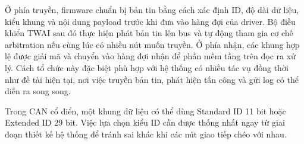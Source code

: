 Ở phía truyền, firmware chuẩn bị bản tin bằng cách xác định ID, độ dài dữ liệu, kiểu khung
và nội dung payload trước khi đưa vào hàng đợi của driver. Bộ điều khiển TWAI sau đó
thực hiện phát bản tin lên bus và tự động tham gia cơ chế arbitration nếu cùng lúc có nhiều
nút muốn truyền. Ở phía nhận, các khung hợp lệ được giải mã và chuyển vào hàng đợi nhận
để phần mềm tầng trên đọc ra xử lý. Cách tổ chức này đặc biệt phù hợp với hệ thống có
nhiều tác vụ đồng thời như đề tài hiện tại, nơi việc truyền bản tin, phát hiện tấn công và gửi
log có thể diễn ra song song.

Trong CAN cổ điển, một khung dữ liệu có thể dùng Standard ID 11 bit hoặc Extended ID
29 bit. Việc lựa chọn kiểu ID cần được thống nhất ngay từ giai đoạn thiết kế hệ thống để
tránh sai khác khi các nút giao tiếp chéo với nhau.


